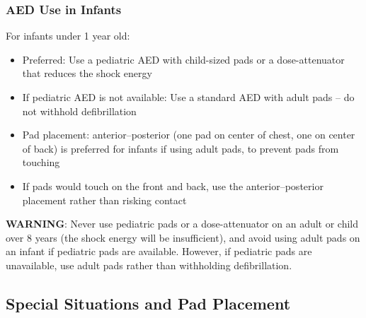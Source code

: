 \subsubsection{AED Use in Infants}
For infants under 1 year old:
\begin{itemize}
  \item Preferred: Use a pediatric AED with child-sized pads or a dose-attenuator that reduces the shock energy
  \item If pediatric AED is not available: Use a standard AED with adult pads -- do not withhold defibrillation
  \item Pad placement: anterior--posterior (one pad on center of chest, one on center of back) is preferred for infants if using adult pads, to prevent pads from touching
  \item If pads would touch on the front and back, use the anterior--posterior placement rather than risking contact
\end{itemize}
\textbf{WARNING}: Never use pediatric pads or a dose-attenuator on an adult or child over 8 years (the shock energy will be insufficient), and avoid using adult pads on an infant if pediatric pads are available. However, if pediatric pads are unavailable, use adult pads rather than withholding defibrillation.

\subsection{Special Situations and Pad Placement}

